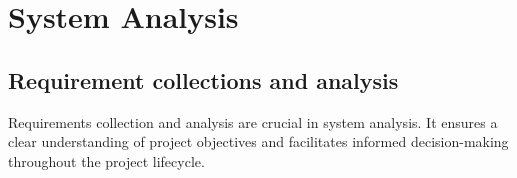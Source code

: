 \chapter{System Analysis}
\section{Requirement collections and analysis}
Requirements collection and analysis are crucial in system analysis. It ensures a clear understanding of project objectives and facilitates informed decision-making throughout the project lifecycle.
